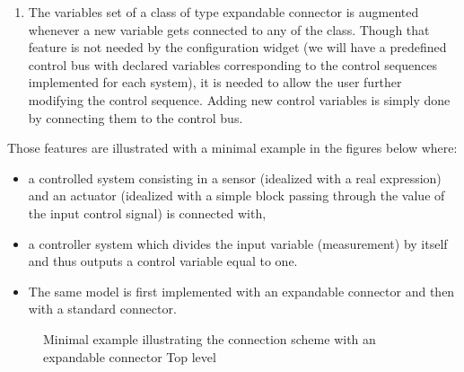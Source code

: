 \documentclass[letterpaper,10pt, openany,english]{sphinxmanual}
\begin{document}
\begin{enumerate}
\item {} 
The variables set of a class of type expandable connector is augmented whenever a new variable gets connected to any  of the class. Though that feature is not needed by the configuration widget (we will have a predefined control bus with declared variables corresponding to the control sequences implemented for each system), it is needed to allow the user further modifying the control sequence. Adding new control variables is simply done by connecting them to the control bus.

\end{enumerate}

Those features are illustrated with a minimal example in the figures below where:
\begin{itemize}
\item {} 
a controlled system consisting in a sensor (idealized with a real expression) and an actuator (idealized with a simple block passing through the value of the input control signal) is connected with,

\item {} 
a controller system which divides the input variable (measurement) by itself and thus outputs a control variable equal to one.

\item {} 
The same model is first implemented with an expandable connector and then with a standard connector.

\end{itemize}

\begin{figure}[htbp]
\centering
\capstart

\noindent{}
\caption{Minimal example illustrating the connection scheme with an expandable connector \textendash{} Top level}\label{\detokenize{requirements:bustestexp}}\end{figure}

\begin{sphinxVerbatim}[commandchars=\\\{\}]
 
 
 
       
 
\end{sphinxVerbatim}
\end{document}
